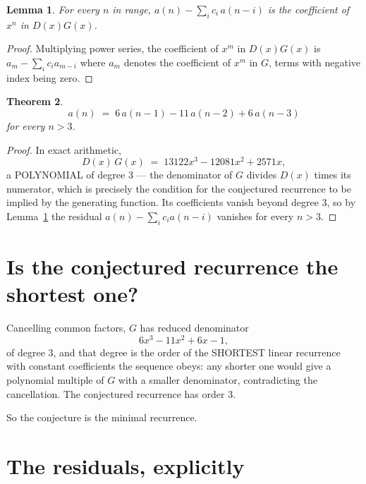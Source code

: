 \documentclass[11pt,a4paper]{article}
\theoremstyle{plain}
\newtheorem{theorem}{Theorem}
\newtheorem{lemma}[theorem]{Lemma}
\theoremstyle{definition}
\begin{document}
\begin{lemma}\label{lem:key}
For every $n$ in range, $a(n)-\sum_i c_i\,a(n-i)$ is the coefficient of $x^{n}$ in
$D(x)G(x)$.
\end{lemma}

\begin{proof}
Multiplying power series, the coefficient of $x^{m}$ in $D(x)G(x)$ is
$a_m-\sum_i c_i a_{m-i}$ where $a_m$ denotes the coefficient of $x^{m}$ in $G$, terms with
negative index being zero.
\end{proof}

\begin{theorem}
\[
a(n)\;=\;6\,a(n-1) - 11\,a(n-2) + 6\,a(n-3)
\]
for every $n>3$.
\end{theorem}

\begin{proof}
In exact arithmetic,
\[
D(x)\,G(x)\;=\;13122 x^{3} - 12081 x^{2} + 2571 x,
\]
a POLYNOMIAL of degree $3$ --- the denominator of $G$ divides $D(x)$ times its numerator,
which is precisely the condition for the conjectured recurrence to be implied by the
generating function. Its coefficients vanish beyond degree $3$, so by
Lemma~\ref{lem:key} the residual $a(n)-\sum_ic_ia(n-i)$ vanishes for every
$n>3$.
\end{proof}

\section{Is the conjectured recurrence the shortest one?}

Cancelling common factors, $G$ has reduced denominator
\[
6 x^{3} - 11 x^{2} + 6 x - 1,
\]
of degree $3$, and that degree is the order of the SHORTEST linear recurrence with
constant coefficients the sequence obeys: any shorter one would give a polynomial multiple of
$G$ with a smaller denominator, contradicting the cancellation. The conjectured recurrence has
order $3$.

So the conjecture is the minimal recurrence.

\section{The residuals, explicitly}
\end{document}
